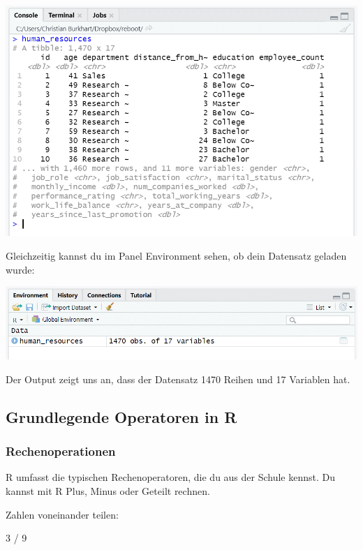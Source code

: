 \documentclass[
]{book}
\newenvironment{Shaded}{\begin{snugshade}}{\end{snugshade}}
\newcommand{\DecValTok}[1]{\textcolor[rgb]{0.00,0.00,0.81}{#1}}
\newcommand{\SpecialCharTok}[1]{\textcolor[rgb]{0.00,0.00,0.00}{#1}}
\begin{document}
\includegraphics{images/02_grundlagen/enviroment.png}

Gleichzeitig kannst du im Panel Environment sehen, ob dein Datensatz geladen wurde:

\includegraphics{images/02_grundlagen/environment1.png}

Der Output zeigt uns an, dass der Datensatz 1470 Reihen und 17 Variablen hat.

\hypertarget{grundlegende-operatoren-in-r}{%
\subsection{Grundlegende Operatoren in R}\label{grundlegende-operatoren-in-r}}

\hypertarget{rechenoperationen}{%
\subsubsection{Rechenoperationen}\label{rechenoperationen}}

R umfasst die typischen Rechenoperatoren, die du aus der Schule kennst. Du kannst mit R Plus, Minus oder Geteilt rechnen.

Zahlen voneinander teilen:

\begin{Shaded}
\begin{Highlighting}[]
\DecValTok{3} \SpecialCharTok{/} \DecValTok{9}
\end{Highlighting}
\end{Shaded}
\end{document}
